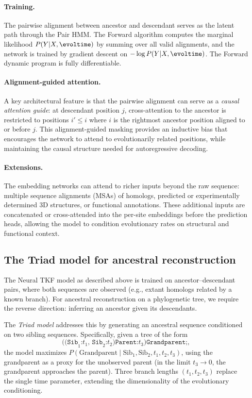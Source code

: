 \paragraph{Training.}
The pairwise alignment between ancestor and descendant
serves as the latent path through the Pair HMM.
The Forward algorithm computes the marginal likelihood
$P(Y | X, \evoltime)$ by summing over all valid alignments,
and the network is trained by gradient descent on $-\log P(Y | X, \evoltime)$.
The Forward dynamic program is fully differentiable.

\paragraph{Alignment-guided attention.}
A key architectural feature is that the pairwise alignment
can serve as a \emph{causal attention guide}:
at descendant position $j$,
cross-attention to the ancestor is restricted
to positions $i' \leq i$ where $i$ is the rightmost ancestor position
aligned to or before $j$.
This alignment-guided masking provides an inductive bias
that encourages the network to attend to evolutionarily related positions,
while maintaining the causal structure needed for autoregressive decoding.

\paragraph{Extensions.}
The embedding networks can attend to richer inputs
beyond the raw sequence:
multiple sequence alignments (MSAs) of homologs,
predicted or experimentally determined 3D structures,
or functional annotations.
These additional inputs are concatenated or cross-attended
into the per-site embeddings before the prediction heads,
allowing the model to condition evolutionary rates
on structural and functional context.

\subsection{The Triad model for ancestral reconstruction}
\label{sec:triad}

The Neural TKF model as described above is trained on ancestor--descendant pairs,
where both sequences are observed (e.g., extant homologs related by a known branch).
For ancestral reconstruction on a phylogenetic tree,
we require the reverse direction:
inferring an ancestor given its descendants.

The \emph{Triad model} addresses this by generating an ancestral sequence
conditioned on two sibling sequences.
Specifically, given a tree of the form
\[
\texttt{((Sib}_1\texttt{:}t_1\texttt{, Sib}_2\texttt{:}t_2\texttt{)Parent:}t_3\texttt{)Grandparent;},\]
the model maximizes $P(\text{Grandparent} \mid \text{Sib}_1, \text{Sib}_2, t_1, t_2, t_3)$,
using the grandparent as a proxy for the unobserved parent
(in the limit $t_3 \to 0$, the grandparent approaches the parent).
Three branch lengths $(t_1, t_2, t_3)$ replace the single time parameter,
extending the dimensionality of the evolutionary conditioning.

